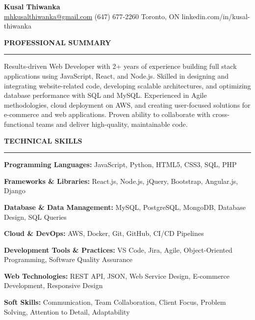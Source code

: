 \documentclass[10pt,letterpaper]{article}
\begin{document}
\begin{center}
{\LARGE\textbf{Kusal Thiwanka}}\\[3pt]
\href{mailto:mhkusalthiwanka@gmail.com}{mhkusalthiwanka@gmail.com}\hspace{2em}%
(647) 677{-}2260\hspace{2em}%
Toronto, ON\hspace{2em}
linkedin.com/in/kusal-thiwanka
\end{center}

\vspace{6pt}

\textbf{PROFESSIONAL SUMMARY}\\[-8pt]
\noindent\rule{\textwidth}{1pt}

\vspace{-2pt}

Results-driven Web Developer with 2+ years of experience building full stack applications using JavaScript, React, and Node.js. Skilled in designing and integrating website-related code, developing scalable architectures, and optimizing database performance with SQL and MySQL. Experienced in Agile methodologies, cloud deployment on AWS, and creating user-focused solutions for e-commerce and web applications. Proven ability to collaborate with cross-functional teams and deliver high-quality, maintainable code.

\vspace{8pt}

\textbf{TECHNICAL SKILLS}\\[-8pt]
\noindent\rule{\textwidth}{1pt}

\vspace{-2pt}

\textbf{Programming Languages:} JavaScript, Python, HTML5, CSS3, SQL, PHP

\textbf{Frameworks \& Libraries:} React.js, Node.js, jQuery, Bootstrap, Angular.js, Django

\textbf{Database \& Data Management:} MySQL, PostgreSQL, MongoDB, Database Design, SQL Queries

\textbf{Cloud \& DevOps:} AWS, Docker, Git, GitHub, CI/CD Pipelines

\textbf{Development Tools \& Practices:} VS Code, Jira, Agile, Object-Oriented Programming, Software Quality Assurance

\textbf{Web Technologies:} REST API, JSON, Web Service Design, E-commerce Development, Responsive Design

\textbf{Soft Skills:} Communication, Team Collaboration, Client Focus, Problem Solving, Attention to Detail, Adaptability
\end{document}
